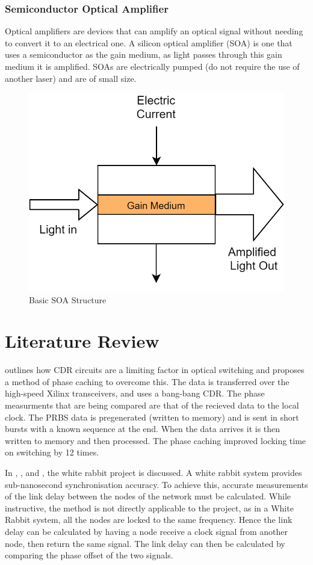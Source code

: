 \subsubsection{Semiconductor Optical Amplifier}%
\label{ssub:semiconductor_optical_amplifier}
Optical amplifiers are devices that can amplify an optical signal without
needing to convert it to an electrical one. 
A silicon optical amplifier (SOA) is one that uses a semiconductor as the gain
medium, as light passes through this gain medium it is amplified.
SOAs are electrically pumped (do not require the use of another laser) and are of
small size.
\begin{figure}[ht]
    \centering
    \includegraphics[width=0.4\linewidth]{img/soa.png}
    \caption{Basic SOA Structure}%
    \label{fig:soa}
\end{figure}



\section{Literature Review}%
\label{sec:literature_review}

\noindent \cite{kari_phase} outlines how CDR circuits are a limiting factor in
optical switching and proposes a method of phase caching to overcome this.
The data is transferred over the high-speed Xilinx transceivers, and uses a
bang-bang CDR. The phase measurments that are being compared are that of the
recieved data to the local clock.
The PRBS data is pregenerated (written to memory) and is sent in short bursts
with a known sequence at the end. When the data arrives it is then written to
memory and then processed.  The phase caching improved locking time on
switching by 12 times.

\noindent In \cite{serrano2013white}, \cite{moreira2010digital}, and
\cite{moreira2009white}, the white rabbit project is discussed. A white rabbit
system provides sub-nanosecond synchronisation accuracy. To achieve this,
accurate measurements of the link delay between the nodes of the network must
be calculated.  While instructive, the method is not directly applicable to the
project, as in a White Rabbit system, all the nodes are locked to the same
frequency. Hence the link delay can be calculated by having a node receive a
clock signal from another node, then return the same signal. The link delay can
then be calculated by comparing the phase offset of the two signals.

